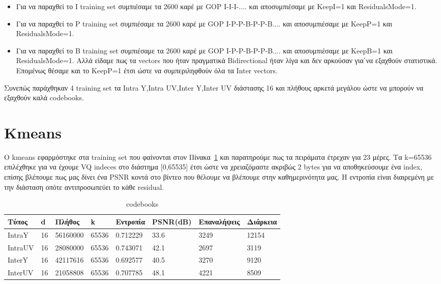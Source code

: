 \begin{itemize}
    \item Για να παραχθεί το I training set συμπιέσαμε τα 2600 καρέ με GOP I-I-I-.... και αποσυμπιέσαμε με KeepI=1 και ResidualsMode=1.
    \item Για να παραχθεί το P training set συμπιέσαμε τα 2600 καρέ με GOP I-P-P-B-P-P-B.... και αποσυμπιέσαμε με KeepP=1 και ResidualsMode=1.
    \item Για να παραχθεί το B training set συμπιέσαμε τα 2600 καρέ με GOP I-P-P-B-P-P-B.... και αποσυμπιέσαμε με KeepB=1 και ResidualsMode=1. Αλλά είδαμε πως τα vectors που ήταν πραγματικά Bidirectional ήταν λίγα και δεν αρκούσαν για΄να εξαχθούν στατιστικά. Επομένως θέσαμε και το KeepP=1 έτσι ώστε να συμπεριληφθούν όλα τα Inter vectors.
\end{itemize}

\indent Συνεπώς παράχθηκαν 4 training set τα Intra Y,Intra UV,Inter Y,Inter UV διάστασης 16 και πλήθους αρκετά μεγάλου ώστε να μπορούν να εξαχθούν καλά codebooks.

\section{Kmeans}
\label{section:sect44}

\indent Ο kmeans εφαρμόστηκε στα training set που φαίνονται στον Πίνακα~\ref{table:trainingset} και παρατηρούμε πως τα πειράματα έτρεχαν για 23 μέρες. Τα k=65536 επιλέχθηκε για να έχουμε VQ indeces στο διάστημα [0,65535] έτσι ώστε να χρειαζόμαστε ακριβώς 2 bytes για να αποθηκεύσουμε ένα index, επίσης βλέπουμε πως μας δίνει ένα PSNR κοντά στο βίντεο που θέλουμε να βλέπουμε στην καθημερινότητα μας. Η εντροπία είναι διαιρεμένη με την διάσταση οπότε αντιπροσωπεύει το κάθε residual.

\begin{table}[h!]
    \begin{center}
        \begin{tabular}{| l | l | l | l | l | l | l | l |}
        \hline
        Τύπος    & d  & Πλήθος   & k     & Εντροπία  & PSNR(dB) & Επαναλήψεις   & Διάρκεια\\ \hline
        IntraY   & 16 & 56160000 & 65536 & 0.712229  & 33.6     &  3249         & 12154                   \\ \hline
        IntraUV  & 16 & 28080000 & 65536 & 0.743071  & 42.1     &  2697         & 3119                    \\ \hline
        InterY   & 16 & 42117616 & 65536 & 0.692577  & 40.5     &  3270         & 9120                    \\ \hline
        InterUV  & 16 & 21058808 & 65536 & 0.707785  & 48.1     &  4221         & 8509                    \\ \hline
        \hline
        \end{tabular}
    \end{center}

    \caption{codebooks}
    \label{table:trainingset}
\end{table}

